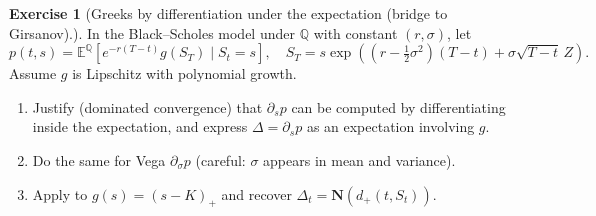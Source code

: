 \documentclass[11pt]{article}
\newcommand{\E}{\mathbb{E}}
\newcommand{\1}{\mathbf{1}}
\theoremstyle{definition}
\newtheorem{exercise}{Exercise}[section]
\begin{document}
\begin{exercise}[Greeks by differentiation under the expectation (bridge to Girsanov).]
In the Black--Scholes model under $\mathbb{Q}$ with constant $(r,\sigma)$,
let
$$
p(t,s)=\E^\mathbb{Q}\!\left[e^{-r(T-t)}g(S_T)\mid S_t=s\right],
\quad
S_T=s\exp\!\left((r-\tfrac12\sigma^2)(T-t)+\sigma\sqrt{T-t}\,Z\right).
$$
Assume $g$ is Lipschitz with polynomial growth.
\begin{enumerate}[leftmargin=1.2em, label=(\alph*), itemsep=0.3em]
\item Justify (dominated convergence) that $\partial_s p$ can be computed by differentiating inside the expectation,
and express $\Delta=\partial_s p$ as an expectation involving $g$.
\item Do the same for Vega $\partial_\sigma p$ (careful: $\sigma$ appears in mean and variance).
\item Apply to $g(s)=(s-K)_+$ and recover $\Delta_t=\mathbf N(d_+(t,S_t))$.
\end{enumerate}

\end{exercise}
\end{document}
